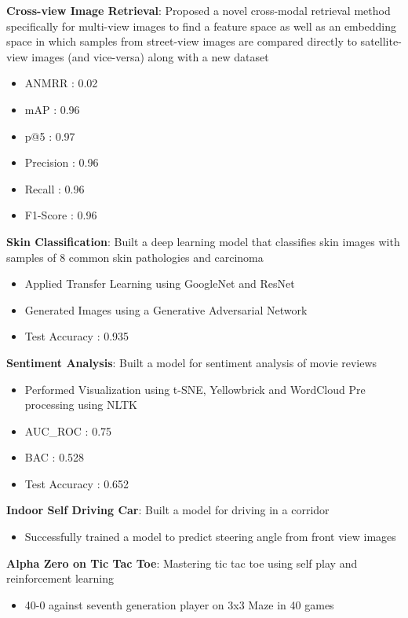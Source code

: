 \documentclass[letterpaper,11pt]{article}
\newcommand{\resumeItem}[2]{
  \item\small{
    \textbf{#1}{: #2 \vspace{-2pt}}
  }
}
\newcommand{\resumeSubItem}[2]{\resumeItem{#1}{#2}\vspace{-4pt}}
\begin{document}
      \resumeSubItem{Cross-view Image Retrieval}
      {Proposed a novel cross-modal retrieval method specifically for multi-view images to find a feature space as well as an embedding space in which samples from street-view images are compared directly to satellite-view images (and vice-versa) along with a new dataset
}
\begin{itemize}
  	  \item ANMRR : 0.02
  	  \item mAP : 0.96
  	  \item p@5 : 0.97
  	  \item Precision : 0.96
  	  \item Recall : 0.96
  	  \item F1-Score : 0.96

  				
  				
			\end{itemize}  
    \resumeSubItem{Skin Classification}
      {Built a deep learning model that classifies skin images with samples of 8 common skin pathologies and carcinoma
}
\begin{itemize}
      \item Applied Transfer Learning using GoogleNet and ResNet
  	  \item Generated Images using a Generative Adversarial Network
  	  \item Test Accuracy : 0.935	

  				
  				
			\end{itemize}
\resumeSubItem{Sentiment Analysis}
      {Built a model for sentiment analysis of movie reviews}
      \begin{itemize}
      \item Performed Visualization using t-SNE, Yellowbrick and WordCloud
Pre processing using NLTK
  	  \item AUC\_ROC : 0.75
  	  \item BAC : 0.528
  	  \item Test Accuracy : 0.652

  				
  				
			\end{itemize}
     
      \resumeSubItem{Indoor Self Driving Car}
      {Built a model for driving in a corridor}
      \begin{itemize}
      \item Successfully trained a model to predict steering angle from front view images    
			\end{itemize}
    \resumeSubItem{Alpha Zero on Tic Tac Toe}
      {Mastering tic tac toe using self play and reinforcement learning}
      \begin{itemize}
      \item 40-0 against seventh generation player on 3x3 Maze in 40
games
			\end{itemize}
      
\end{document}
